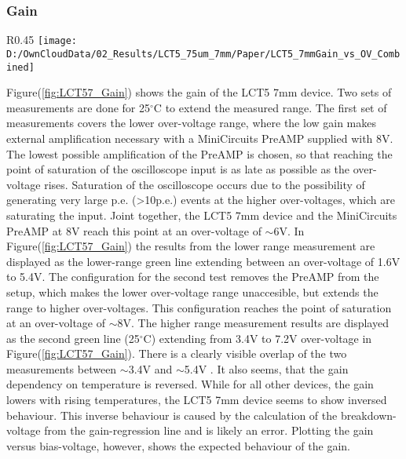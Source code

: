 \documentclass[12pt,article,type=msc,colorback,accentcolor=tud9c]{tudthesis}
\begin{document}
\clearpage
\subsubsection{Gain}
\label{subsubsec:LCT57Gain}
\begin{wrapfigure}{R}{0.45\textwidth}
\centering
\texttt{[image: D:/OwnCloudData/02\_Results/LCT5\_75um\_7mm/Paper/LCT5\_7mmGain\_vs\_OV\_Combined]}
\caption[LCT5 7mm gain]{\label{fig:LCT57_Gain}Gain of the HPK LCT5 7mm pixel}
\end{wrapfigure}
Figure(\ref{fig:LCT57_Gain}) shows the gain of the LCT5 7mm device. Two sets of measurements are done for 25$^\circ$C to extend the measured range. The first set of measurements covers the lower over-voltage range, where the low gain makes external amplification necessary with a MiniCircuits PreAMP supplied with 8V. The lowest possible amplification of the PreAMP is chosen, so that reaching the point of saturation of the oscilloscope input is as late as possible as the over-voltage rises. Saturation of the oscilloscope occurs due to the possibility of generating very large p.e. (>10p.e.) events at the higher over-voltages, which are saturating the input. Joint together, the LCT5 7mm device and the MiniCircuits PreAMP at 8V reach this point at an over-voltage of $\sim$6V. In Figure(\ref{fig:LCT57_Gain}) the results from the lower range measurement are displayed as the lower-range green line extending between an over-voltage of 1.6V to 5.4V.
The configuration for the second test removes the PreAMP from the setup, which makes the lower over-voltage range unaccesible, but extends the range to higher over-voltages. This configuration reaches the point of saturation at an over-voltage of $\sim$8V. The higher range measurement results are displayed as the second green line (25$^\circ$C) extending from 3.4V to 7.2V over-voltage in Figure(\ref{fig:LCT57_Gain}). There is a clearly visible overlap of the two measurements between $\sim$3.4V and $\sim$5.4V . It also seems, that the gain dependency on temperature is reversed. While for all other devices, the gain lowers with rising temperatures, the LCT5 7mm device seems to show inversed behaviour. This inverse behaviour is caused by the calculation of the breakdown-voltage from the gain-regression line and is likely an error. Plotting the gain versus bias-voltage, however, shows the expected behaviour of the gain.


\newpage
\end{document}
